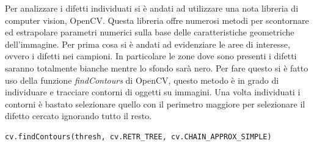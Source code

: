 \documentclass[12pt,a4paper,openright,twoside]{report}
\begin{document}
Per analizzare i difetti individuati si è andati ad utilizzare una nota libreria di computer vision, OpenCV. Questa libreria offre numerosi metodi per scontornare ed estrapolare parametri numerici sulla base delle caratteristiche geometriche dell'immagine. 
Per prima cosa si è andati ad evidenziare le aree di interesse, ovvero i difetti nei campioni. In particolare le zone dove sono presenti i difetti saranno totalmente bianche mentre lo sfondo sarà nero. 
Per fare questo si è fatto uso della funzione \emph{findContours} di OpenCV, questo metodo è in grado di individuare e tracciare contorni di oggetti su immagini.
Una volta individuati i contorni è bastato selezionare quello con il perimetro maggiore per selezionare il difetto cercato ignorando tutto il resto. 
\begin{verbatim}
cv.findContours(thresh, cv.RETR_TREE, cv.CHAIN_APPROX_SIMPLE)    
\end{verbatim}
\end{document}
